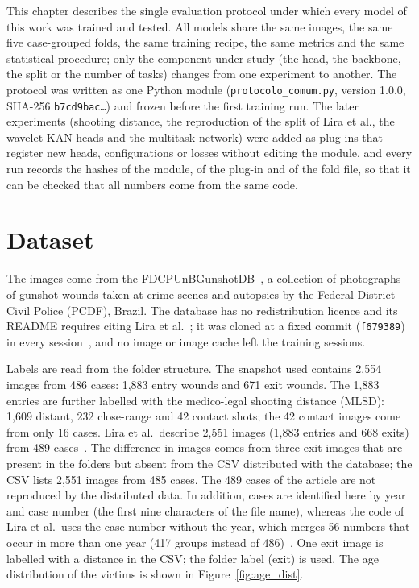 \label{chap:methodology}

This chapter describes the single evaluation protocol under which every model of this work was trained and tested. All models share the same images, the same five case-grouped folds, the same training recipe, the same metrics and the same statistical procedure; only the component under study (the head, the backbone, the split or the number of tasks) changes from one experiment to another. The protocol was written as one Python module (\texttt{protocolo\_comum.py}, version 1.0.0, SHA-256 \texttt{b7cd9bac\ldots}) and frozen before the first training run. The later experiments (shooting distance, the reproduction of the split of Lira et al., the wavelet-KAN heads and the multitask network) were added as plug-ins that register new heads, configurations or losses without editing the module, and every run records the hashes of the module, of the plug-in and of the fold file, so that it can be checked that all numbers come from the same code.

\section{Dataset}
\label{sec:dataset_desc}

The images come from the FDCPUnBGunshotDB~\cite{Lira2025deep}, a collection of photographs of gunshot wounds taken at crime scenes and autopsies by the Federal District Civil Police (PCDF), Brazil. The database has no redistribution licence and its README requires citing Lira et al.~\cite{Lira2025deep}; it was cloned at a fixed commit (\texttt{f679389}) in every session~\cite{fdcpunbgunshotdb}, and no image or image cache left the training sessions.

Labels are read from the folder structure. The snapshot used contains 2,554 images from 486 cases: 1,883 entry wounds and 671 exit wounds. The 1,883 entries are further labelled with the medico-legal shooting distance (MLSD): 1,609 distant, 232 close-range and 42 contact shots; the 42 contact images come from only 16 cases. Lira et al.\ describe 2,551 images (1,883 entries and 668 exits) from 489 cases~\cite{Lira2025deep}. The difference in images comes from three exit images that are present in the folders but absent from the CSV distributed with the database; the CSV lists 2,551 images from 485 cases. The 489 cases of the article are not reproduced by the distributed data. In addition, cases are identified here by year and case number (the first nine characters of the file name), whereas the code of Lira et al.\ uses the case number without the year, which merges 56 numbers that occur in more than one year (417 groups instead of 486)~\cite{leguwoi}. One exit image is labelled with a distance in the CSV; the folder label (exit) is used. The age distribution of the victims is shown in Figure~\ref{fig:age_dist}.

